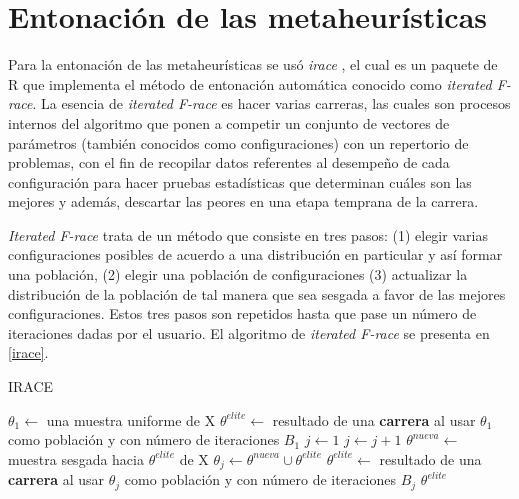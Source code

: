 \chapter{Entonación de las metaheurísticas}
\label{Apéndices}

Para la entonación de las metaheurísticas se usó \emph{irace} \cite{lopez2016irace}, el cual es un paquete de R que implementa el método de entonación automática conocido como \emph{iterated F-race}. La esencia de \emph{iterated F-race}
es hacer varias carreras, las cuales son procesos internos del algoritmo que ponen a competir un conjunto de vectores de parámetros (también conocidos como configuraciones) con un repertorio de problemas, con el fin de recopilar datos referentes al desempeño de cada configuración para hacer pruebas estadísticas que determinan cuáles son las mejores y además, descartar las peores en una etapa temprana de la carrera. 

\emph{Iterated F-race} trata de un método que consiste en tres pasos: (1) elegir varias configuraciones posibles de acuerdo a una distribución en particular y así formar una población, (2) elegir una población de configuraciones (3) actualizar la distribución de la población de tal manera que sea sesgada a favor de las mejores configuraciones. Estos tres pasos son repetidos hasta que pase un número de iteraciones dadas por el usuario. El algoritmo de \emph{iterated F-race} se presenta en \ref{irace}.

\begin{algorithm}
\caption{IRACE}
\label{irace}
\begin{algorithmic}[1]


\State $\theta_1 \gets$ una muestra uniforme de X
\State $\theta^{elite} \gets$ resultado de una \textbf{carrera} al usar $\theta_1$ como población y con número de iteraciones $B_1$
\State $j \gets 1$
	\State $j \gets j + 1$
	\State $\theta^{nueva} \gets$ muestra sesgada hacia $\theta^{elite}$ de X 
	\State $\theta_j \gets \theta^{nueva} \cup \theta^{elite}$
	\State $\theta^{elite} \gets$ resultado de una \textbf{carrera} al usar $\theta_j$ como población y con número de iteraciones $B_j$
\EndWhile
\State \Return $\theta^{elite}$

\end{algorithmic}
\end{algorithm}

